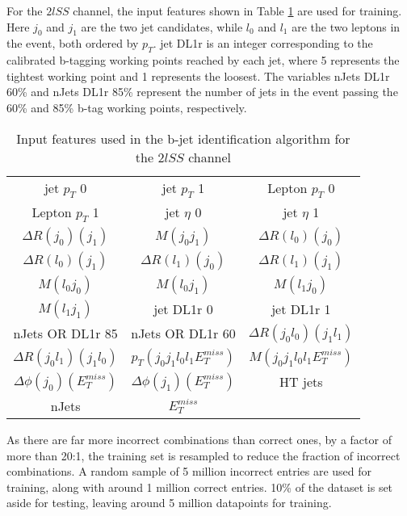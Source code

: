For the $2lSS$ channel, the input features shown in Table \ref{tab:top2lSSfeatures} are used for training. Here $j_0$ and $j_1$ are the two jet candidates, while $l_0$ and $l_1$ are the two leptons in the event, both ordered by $p_T$. jet DL1r is an integer corresponding to the calibrated b-tagging working points reached by each jet, where 5 represents the tightest working point and 1 represents the loosest. The variables nJets DL1r 60\% and nJets DL1r 85\% represent the number of jets in the event passing the 60\% and 85\% b-tag working points, respectively.

\begin{table}[H]
  \begin{center}
  \begin{tabular}{ccc}
  \hline\hline
    jet  $p_T$ 0 & jet  $p_T$ 1 & Lepton  $p_T$ 0 \\
    Lepton  $p_T$ 1 & jet  $\eta$ 0 & jet  $\eta$ 1 \\
    $\Delta R(j_0)(j_1)$ & $M(j_0j_1)$ & $\Delta R(l_0)(j_0)$ \\
    $\Delta R(l_0)(j_1)$ & $\Delta R(l_1)(j_0)$ & $\Delta R(l_1)(j_1)$ \\
    $M(l_0j_0)$ & $M(l_0j_1)$ & $M(l_1j_0)$ \\
    $M(l_1j_1)$ & jet DL1r 0 & jet DL1r 1 \\
    nJets OR DL1r 85 & nJets OR DL1r 60 & $\Delta R(j_0l_0)(j_1l_1)$ \\
    $\Delta R(j_0l_1)(j_1l_0)$ &  $p_T(j_0j_1l_0l_1E_T^{miss})$ & $M(j_0j_1l_0l_1E_T^{miss})$ \\
    $\Delta\phi(j_0)(E_T^{miss})$ & $\Delta\phi(j_1)(E_T^{miss})$ & HT jets \\
    nJets & $E_T^{miss}$ & \\
  \hline
  \end{tabular}
  \end{center}
  \caption{Input features used in the b-jet identification algorithm for the $2lSS$ channel}
  \label{tab:top2lSSfeatures}                                                                                               
\end{table}

As there are far more incorrect combinations than correct ones, by a factor of more than 20:1, the training set is resampled to reduce the fraction of incorrect combinations. A random sample of 5 million incorrect entries are used for training, along with around 1 million correct entries. 10\% of the dataset is set aside for testing, leaving around 5 million datapoints for training. 


